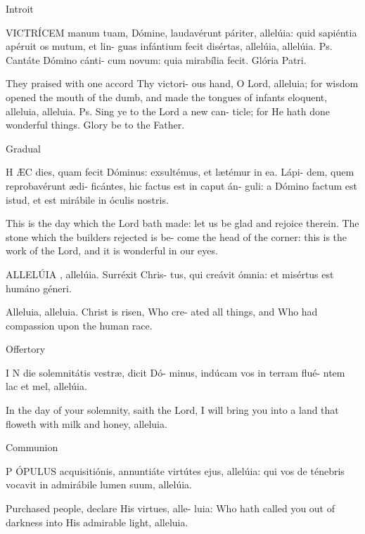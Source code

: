 
Introit

VICTRÍCEM
  manum  tuam,  Dómine,  
laudavérunt   páriter,   allelúia:   quid   
sapiéntia  apéruit  os  mutum,  et  lin-
guas infántium fecit disértas, allelúia, 
allelúia. 
Ps.
  Cantáte  Dómino  cánti-
cum   novum:   quia   mirabília   fecit.   
Glória Patri. 

They  praised  with  one  accord  Thy  victori-
ous  hand,  O  Lord,  alleluia;  for  wisdom  
opened the mouth of the dumb, and made 
the  tongues  of  infants  eloquent,  alleluia,  
alleluia. 
Ps.
 Sing ye to the Lord a new can-
ticle;  for  He  hath  done  wonderful  things.  
Glory be to the Father. 


Gradual

H
ÆC
   dies,   quam   fecit   Dóminus:   
exsultémus,  et  lætémur  in  ea.  Lápi-
dem,    quem    reprobavérunt    ædi-
ficántes,  hic  factus  est  in  caput  án-
guli:  a  Dómino  factum  est  istud,  et  
est mirábile in óculis nostris. 

This is the day which the Lord bath made: 
let  us  be  glad  and  rejoice  therein.  The  
stone  which  the  builders  rejected  is  be-
come  the  head  of  the  corner:  this  is  the  
work  of  the  Lord,  and  it  is  wonderful  in  
our eyes. 

ALLELÚIA
,  allelúia.  Surréxit  Chris-
tus,  qui  creávit  ómnia:  et  misértus  
est humáno géneri. 

Alleluia,  alleluia.  Christ  is  risen,  Who  cre-
ated  all  things,  and  Who  had  compassion  
upon the human race. 

Offertory

I
N
 die solemnitátis 
vestræ, dicit Dó-
minus,  indúcam  vos  in  terram  flué-
ntem lac et mel, allelúia. 

In  the  day  of  your  solemnity,  saith  the  
Lord,  I  will  bring  you  into  a  land  that  
floweth with milk and honey, alleluia. 

Communion

P
ÓPULUS
   acquisitiónis,   annuntiáte   
virtútes   ejus,   allelúia:   qui   vos   de   
ténebris vocavit in admirábile lumen 
suum, allelúia. 

Purchased people, declare His virtues, alle-
luia:  Who  hath  called  you  out  of  darkness  
into His admirable light, alleluia. 
